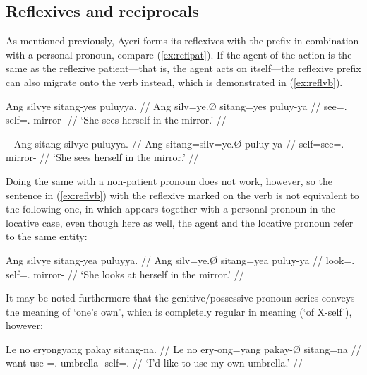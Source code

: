 
\subsection{Reflexives and reciprocals}
\label{subsec:reflrec}

As mentioned previously, Ayeri forms its reflexives with the prefix 
 in combination with a personal pronoun, compare 
(\ref{ex:reflpat}). If the agent of the action is the same as the reflexive 
patient---that is, the agent acts on itself---the reflexive prefix can also 
migrate onto the verb instead, which is demonstrated in (\ref{ex:reflvb}).

\ex\label{ex:reflpat}\begingl
	\gla Ang silvye sitang-yes puluyya. //
	\glb Ang silv=ye.Ø sitang=yes puluy-ya //
	\glc \AgtT{} see=\TsgF{}.\Top{} self=\TsgF{}.\Parg{} mirror-\Loc{} //
	\glft `She sees herself in the mirror.' //
\endgl\xe

\ex~\label{ex:reflvb}\begingl
	\gla Ang sitang-silvye puluyya. //
	\glb Ang sitang=silv=ye.Ø puluy-ya //
	\glc \AgtT{} self=see=\TsgF{}.\Top{} mirror-\Loc{} //
	\glft `She sees herself in the mirror.' //
\endgl\xe

Doing the same with a non-patient pronoun does not work, however, so the
sentence in (\ref{ex:reflvb}) with the reflexive  marked
on the verb is not equivalent to the following one, in which
 appears together with a personal pronoun in the locative
case, even though here as well, the agent and the locative pronoun refer to the
same entity:

\ex\label{ex:reflloc}\begingl
	\gla Ang silvye sitang-yea puluyya. //
	\glb Ang silv=ye.Ø sitang=yea puluy-ya //
	\glc \AgtT{} look=\TsgF{}.\Top{} self=\TsgF{}.\Loc{} mirror-\Loc{} //
	\glft `She looks at herself in the mirror.' //
\endgl\xe

It may be noted furthermore that the genitive/possessive pronoun series conveys 
the meaning of `one's own', which is completely regular in meaning (`of 
X-self'), however:

\ex\begingl
	\gla Le no eryongyang pakay sitang-nā. //
	\glb Le no ery-ong=yang pakay-Ø sitang=nā //
	\glc \PatTI{} want use-\Irr{}=\Fsg{}.\Aarg{} umbrella-\Top{} 
		self=\Fsg{}.\Gen{} //
	\glft `I'd like to use my own umbrella.' //
\endgl\xe



